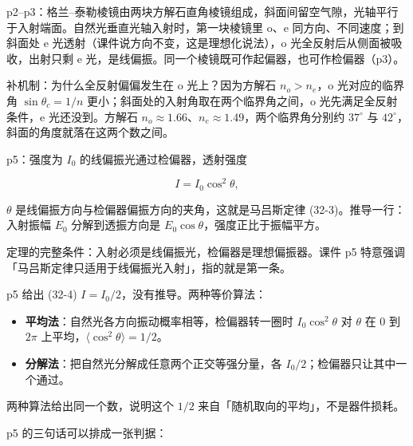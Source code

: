 \documentclass[11pt]{ctexart}
\begin{document}

p2--p3：格兰--泰勒棱镜由两块方解石直角棱镜组成，斜面间留空气隙，光轴平行于入射端面。自然光垂直光轴入射时，第一块棱镜里 o、e 同方向、不同速度；到斜面处 e 光透射（课件说方向不变，这是理想化说法），o 光全反射后从侧面被吸收，出射只剩 e 光，是线偏振。同一个棱镜既可作起偏器，也可作检偏器（p3）。

补机制：为什么全反射偏偏发生在 o 光上？因为方解石 $n_o>n_e$，o 光对应的临界角 $\sin\theta_c=1/n$ 更小；斜面处的入射角取在两个临界角之间，o 光先满足全反射条件，e 光还没到。方解石 $n_o\approx1.66$、$n_e\approx1.49$，两个临界角分别约 $37^\circ$ 与 $42^\circ$，斜面的角度就落在这两个数之间。



p5：强度为 $I_0$ 的线偏振光通过检偏器，透射强度

\[ I=I_0\cos^2\theta, \]

$\theta$ 是线偏振方向与检偏器偏振方向的夹角，这就是马吕斯定律 (32-3)。推导一行：入射振幅 $E_0$ 分解到透振方向是 $E_0\cos\theta$，强度正比于振幅平方。

定理的完整条件：入射必须是线偏振光，检偏器是理想偏振器。课件 p5 特意强调「马吕斯定律只适用于线偏振光入射」，指的就是第一条。



p5 给出 (32-4) $I=I_0/2$，没有推导。两种等价算法：

\begin{itemize}
\item \textbf{平均法}：自然光各方向振动概率相等，检偏器转一圈时 $I_0\cos^2\theta$ 对 $\theta$ 在 $0$ 到 $2\pi$ 上平均，$\langle\cos^2\theta\rangle=1/2$。
\item \textbf{分解法}：把自然光分解成任意两个正交等强分量，各 $I_0/2$；检偏器只让其中一个通过。
\end{itemize}

两种算法给出同一个数，说明这个 $1/2$ 来自「随机取向的平均」，不是器件损耗。


p5 的三句话可以排成一张判据：
\end{document}
